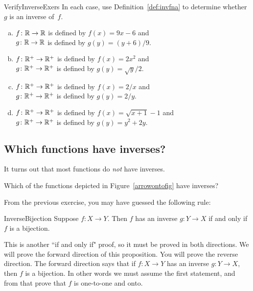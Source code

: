  \begin{exercise}{VerifyInverseExers}
 In each case, use Definition~\ref{def:invfna} to determine whether $g$ is an inverse of~$f$.
 \begin{enumerate}[(a)]
 \item \label{VerifyInverseExers-(9x-6)}
$f \colon \mathbb{R} \to \mathbb{R}$ is defined by $f(x) = 9x - 6$ and 
 \\ $g \colon \mathbb{R} \to \mathbb{R}$ is defined by $g(y) = (y + 6)/9$.
 \item \label{VerifyInverseExers-(x^2)}
$f \colon \mathbb{R}^+ \to \mathbb{R}^+$ is defined by $f(x) =2x^2$ and 
 \\ $g \colon \mathbb{R}^+ \to \mathbb{R}^+$ is defined by $g(y) = \sqrt{y}/2$.
 \item \label{VerifyInverseExers-(1/x)}
$f \colon \mathbb{R}^+ \to \mathbb{R}^+$ is defined by $f(x) = 2/x$ and 
 \\ $g \colon \mathbb{R}^+ \to \mathbb{R}^+$ is defined by $g(y) = 2/y$.
 \item \label{VerifyInverseExers-(sqrt(x+1)-1)}
$f \colon \mathbb{R}^+ \to \mathbb{R}^+$ is defined by $f(x) = \sqrt{x+1} - 1$ and 
 \\ $g \colon \mathbb{R}^+ \to \mathbb{R}^+$ is defined by $g(y) = y^2 + 2y$.
 \end{enumerate}
 \end{exercise}
   
\subsection{Which functions have inverses?}\label{subsec:fun:inv}

It turns out that most functions do \emph{not} have inverses.  

\begin{exercise}{92}
Which of the functions depicted  in Figure~\ref{arrowontofig} have inverses?
 \end{exercise}

From the previous exercise, you may have guessed the following rule:

 \begin{prop}{InverseBijection}
 Suppose $f\colon X \to Y$. Then $f$ has an inverse $g \colon Y \to X$ if and only if $f$ is a bijection.
 \end{prop}
 
 This is another ``if and only if" proof, so it must be proved in both directions. We will prove the forward direction of this proposition.  You will prove the reverse direction.  The forward direction says that if $f \colon X \to Y$ has an inverse $g \colon Y \to X$, then $f$ is a bijection.  In other words we must assume the first statement, and from that prove that $f$ is one-to-one and onto.


